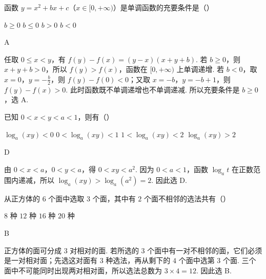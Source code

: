 \begin{problem}
函数 \( y = x^{2} + bx + c \)（\(x \in [0, +\infty)\)）是单调函数的充要条件是（\quad）

\choices
    {\(b \geqslant 0\)}
    {\(b \leqslant 0\)}
    {\(b > 0\)}
    {\(b < 0\)}
\end{problem}

\begin{answer}
A
\end{answer}

\begin{solution}
任取 \(0\leqslant x<y\)，有
\(f(y)-f(x)=(y-x)(x+y+b)\).
若 \(b\geqslant0\)，则 \(x+y+b>0\)，所以 \(f(y)>f(x)\)，函数在 \([0,+\infty)\) 上单调递增. 若 \(b<0\)，取 \(x=0\)，\(y=-\frac b2\)，则 \(f(y)-f(0)<0\)；又取 \(x=-b\)，\(y=-b+1\)，则 \(f(y)-f(x)>0\). 此时函数既不单调递增也不单调递减. 所以充要条件是 \(b\geqslant0\)，选 A.
\end{solution}

\begin{problem}
已知 \(0 < x < y < a < 1\)，则有（\quad）

\choices
    {\(\log_a(xy) < 0\)}
    {\(0 < \log_a(xy) < 1\)}
    {\(1 < \log_a(xy) < 2\)}
    {\(\log_a(xy) > 2\)}
\end{problem}

\begin{answer}
D
\end{answer}

\begin{solution}
由 \(0<x<a\)，\(0<y<a\)，得 \(0<xy<a^2\). 因为 \(0<a<1\)，函数 \(\log_a t\) 在正数范围内递减，所以
\(\log_a(xy)>\log_a(a^2)=2\).
因此选 D.
\end{solution}

\begin{problem}
从正方体的 \(6\) 个面中选取 \(3\) 个面，其中有 \(2\) 个面不相邻的选法共有（\quad）

\choices
    {\(8\) 种}
    {\(12\) 种}
    {\(16\) 种}
    {\(20\) 种}
\end{problem}

\begin{answer}
B
\end{answer}

\begin{solution}
正方体的面可分成 \(3\) 对相对的面. 若所选的 \(3\) 个面中有一对不相邻的面，它们必须是一对相对面；先选这对面有 \(3\) 种选法，再从剩下的 \(4\) 个面中选第 \(3\) 个面. 三个面中不可能同时出现两对相对面，所以选法总数为 \(3\times4=12\). 因此选 B.
\end{solution}

